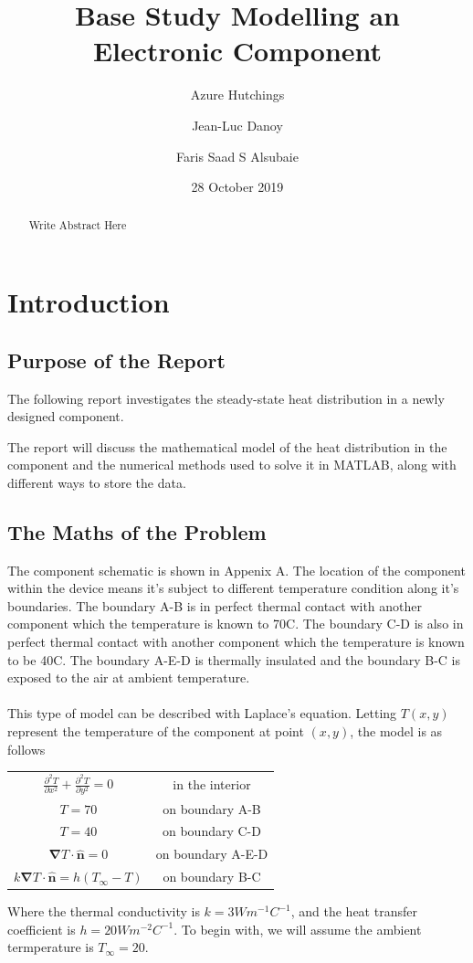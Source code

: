 \documentclass[12pt,a4paper]{article}
\title{Base Study Modelling an Electronic Component}
\author{
  Azure Hutchings
  \and
  Jean-Luc Danoy
  \and
  Faris Saad S Alsubaie
}
\date{28 October 2019}
\begin{document}
 
\begin{titlepage}
\maketitle
\end{titlepage}

\renewcommand{\abstractname}{Executive Summary}
\begin{abstract}
Write Abstract Here
\end{abstract}

\pagebreak

\tableofcontents

\pagebreak

\section{Introduction}

\subsection{Purpose of the Report}
The following report investigates the steady-state heat distribution in a newly designed component. 

The report will discuss the mathematical model of the heat distribution in the component and the numerical methods used to solve it in MATLAB, along with different ways to store the data.

\subsection{The Maths of the Problem}
The component schematic is shown in Appenix A. The location of the component within the device means it's subject to different temperature condition along it's boundaries. The boundary A-B is in perfect thermal contact with another component which the temperature is known to 70\degree C. The boundary C-D is also in perfect thermal contact with another component which the temperature is known to be 40\degree C. The boundary A-E-D is thermally insulated and the boundary B-C is exposed to the air at ambient temperature.
\\\\
This type of model can be described with Laplace's equation. Letting $T(x,y)$ represent the temperature of the component at point $(x, y)$, the model is as follows	

\begin{center}
\begin{tabular}{c c}
$\frac{\partial^2 T}{\partial x^2}+\frac{\partial^2 T}{\partial y^2}=0$ & in the interior\\
$T = 70$ & on boundary A-B \\
$T = 40$ & on boundary C-D \\
$\boldsymbol{\nabla} T \cdot {\hat{\textbf{n}}} = 0$ & on boundary A-E-D\\
$k\boldsymbol{\nabla}T\cdot\hat{\textbf{n}} = h(T_{\infty} - T)$ & on boundary B-C
\end{tabular}
\end{center}
Where the thermal conductivity is $k=3Wm^{-1}C^{-1}$, and the heat transfer coefficient is $h=20 Wm^{-2}C^{-1}$. To begin with, we will assume the ambient termperature is $T_\infty = 20$.
\end{document}
